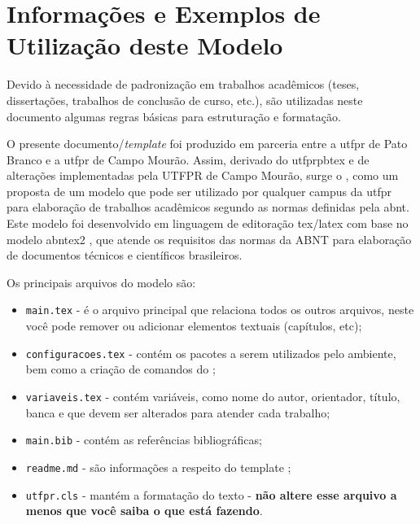 \chapter{Informações e Exemplos de Utilização deste Modelo}\label{cap:exemplo}

Devido à necessidade de padronização em trabalhos acadêmicos (teses, dissertações, trabalhos de conclusão de curso, etc.), são utilizadas neste documento algumas regras básicas para estruturação e formatação.

O presente documento/\textit{template} foi produzido em parceria entre a \gls{utfpr} de Pato Branco e a \gls{utfpr} de Campo Mourão. Assim, derivado do \gls{utfprpbtex} e de alterações implementadas pela UTFPR de Campo Mourão, surge o \utfprtex, como um proposta de um modelo \latex que pode ser utilizado por qualquer campus da \gls{utfpr} para elaboração de trabalhos acadêmicos segundo as normas definidas pela \gls{abnt}. Este modelo foi desenvolvido em linguagem de editoração \gls{tex}/\gls{latex} com base no modelo \gls{abntex2} \cite{abnTeX2:2013}, que atende os requisitos das normas da ABNT para elaboração de documentos técnicos e científicos brasileiros.

Os principais arquivos do modelo são:
\begin{itemize}
    \item \texttt{main.tex} - é o arquivo principal que relaciona todos os outros arquivos, neste você pode remover ou adicionar elementos textuais (capítulos, etc);
    \item \texttt{configuracoes.tex} - contém os pacotes a serem utilizados pelo ambiente, bem como a criação de comandos do \latex;
    \item \texttt{variaveis.tex} - contém variáveis, como nome do autor, orientador, título, banca e que devem ser alterados para atender cada trabalho;
    \item \texttt{main.bib} - contém as referências bibliográficas;
    \item \texttt{readme.md} - são informações a respeito do template \latex;
    \item \texttt{utfpr.cls} - mantém a formatação do texto - \textbf{não altere esse arquivo a menos que você saiba o que está fazendo}.
\end{itemize}

